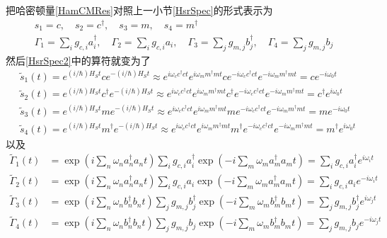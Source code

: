 把哈密顿量\eqref{HamCMRes}对照上一小节\eqref{HsrSpec}的形式表示为
\begin{equation}
\begin{gathered}
s_{1}=c, \quad s_{2}=c^{\dagger}, \quad s_{3}=m, \quad s_{4}=m^{\dagger} \\
\Gamma_{1}= \sum_{i} g_{c,i} a_{i}^{\dag}, \quad \Gamma_{2}= \sum_{i} g_{c,i} a_{i}, \quad \Gamma_{3}= \sum_{j} g_{m,j} b_{j}^{\dag}, \quad \Gamma_{4}= \sum_{j} g_{m,j} b_{j}
\end{gathered}
\end{equation}
然后\eqref{HsrSpec2}中的算符就变为了
\begin{equation}
\begin{aligned}
&\tilde{s}_{1}(t)=e^{(i / \hbar) H_{S} t} c e^{-(i / \hbar) H_{S} t} \approx e^{i \omega_{c}c^{\dag}c t} e^{i \omega_{m}m^{\dag}m t} c e^{-i \omega_{c}c^{\dag}c t} e^{-i \omega_{m}m^{\dag}m t} = c e^{-i \omega_{0} t} \\
&\tilde{s}_{2}(t)=e^{(i / \hbar) H_{S} t} c^{\dagger} e^{-(i / \hbar) H_{S} t} \approx e^{i \omega_{c}c^{\dag}c t} e^{i \omega_{m}m^{\dag}m t} c^{\dagger} e^{-i \omega_{c}c^{\dag}c t} e^{-i \omega_{m}m^{\dag}m t} = c^{\dagger} e^{i \omega_{0} t} \\
&\tilde{s}_{3}(t)=e^{(i / \hbar) H_{S} t} m e^{-(i / \hbar) H_{S} t} \approx e^{i \omega_{c}c^{\dag}c t} e^{i \omega_{m}m^{\dag}m t} m e^{-i \omega_{c}c^{\dag}c t} e^{-i \omega_{m}m^{\dag}m t} = m e^{-i \omega_{0} t} \\
&\tilde{s}_{4}(t)=e^{(i / \hbar) H_{S} t} m^{\dagger} e^{-(i / \hbar) H_{S} t} \approx e^{i \omega_{c}c^{\dag}c t} e^{i \omega_{m}m^{\dag}m t} m^{\dagger} e^{-i \omega_{c}c^{\dag}c t} e^{-i \omega_{m}m^{\dag}m t} =m^{\dagger} e^{i \omega_{0} t}
\label{interactS}
\end{aligned}
\end{equation}
以及
\begin{equation}
\begin{aligned}
\tilde{\Gamma}_{1}(t) &=\exp \left(i \sum_{n}\omega_{n}a_{n}^{\dag}a_{n} t\right) \sum_{i} g_{c,i} a_{i}^{\dag} \exp \left(-i \sum_{m}\omega_{m}a_{m}^{\dag}a_{m} t\right) =\sum_{i} g_{c,i} a_{i}^{\dag} e^{i \omega_{i} t} \\
\tilde{\Gamma}_{2}(t) &=\exp \left(i \sum_{n}\omega_{n}a_{n}^{\dag}a_{n} t\right) \sum_{i} g_{c,i} a_{i} \exp \left(-i \sum_{m}\omega_{m}a_{m}^{\dag}a_{m} t\right) =\sum_{i} g_{c,i} a_{i} e^{-i \omega_{i} t} \\
\tilde{\Gamma}_{3}(t) &=\exp \left(i \sum_{n}\omega_{n}b_{n}^{\dag}b_{n} t\right) \sum_{j} g_{m,j} b_{j}^{\dag} \exp \left(-i \sum_{m}\omega_{m}b_{m}^{\dag}b_{m} t\right) =\sum_{j} g_{m,j} b_{j}^{\dag} e^{i \omega_{j} t} \\
\tilde{\Gamma}_{4}(t) &=\exp \left(i \sum_{n}\omega_{n}b_{n}^{\dag}b_{n} t\right) \sum_{j} g_{m,j} b_{j} \exp \left(-i \sum_{m}\omega_{m}b_{m}^{\dag}b_{m} t\right) =\sum_{j} g_{m,j} b_{j} e^{-i \omega_{j} t}
\label{interactGam}
\end{aligned}
\end{equation}
